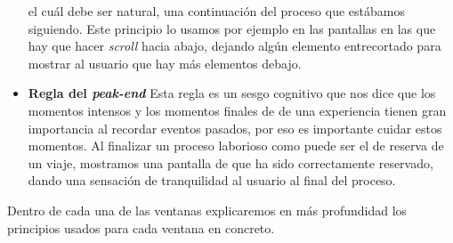 \begin{itemize}
            el cuál debe ser natural, una continuación del proceso que estábamos siguiendo. Este principio lo usamos por ejemplo en las pantallas en las que hay que hacer \textit{scroll} hacia abajo,
            dejando algún elemento entrecortado para mostrar al usuario que hay más elementos debajo.
      \item \textbf{Regla del \textit{peak-end}} Esta regla es un sesgo cognitivo que nos dice que los momentos intensos y los momentos finales de
            de una experiencia tienen gran importancia al recordar eventos pasados, por eso es importante cuidar estos momentos. Al finalizar un proceso laborioso como
            puede ser el de reserva de un viaje, mostramos una pantalla de que ha sido correctamente reservado, dando una sensación de tranquilidad al usuario
            al final del proceso.

\end{itemize}

Dentro de cada una de las ventanas explicaremos en más profundidad los principios usados para cada ventana en concreto.
